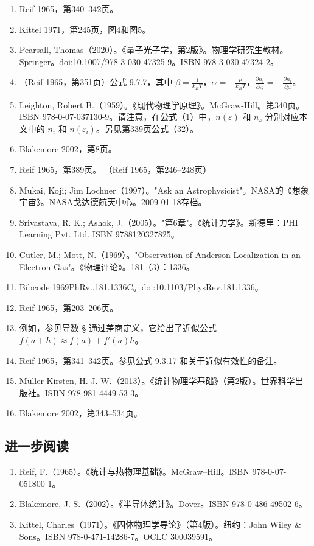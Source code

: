 \begin{enumerate}
\item Reif 1965，第340–342页。  
\item Kittel 1971，第245页，图4和图5。  
\item Pearsall, Thomas（2020）。《量子光子学，第2版》。物理学研究生教材。Springer。doi:10.1007/978-3-030-47325-9。ISBN 978-3-030-47324-2。  
\item （Reif 1965，第351页）公式 9.7.7，其中 \( \beta = \frac{1}{k_B T} \)，\( \alpha = -\frac{\mu}{k_B T} \)，\( \frac{\partial \bar{n}_i}{\partial \epsilon_i} = -\frac{\partial \bar{n}_i}{\partial \mu} \)。  
\item Leighton, Robert B.（1959）。《现代物理学原理》。McGraw-Hill。第340页。ISBN 978-0-07-037130-9。请注意，在公式（1）中，\( n(\varepsilon) \) 和 \( n_s \) 分别对应本文中的 \( \bar{n}_i \) 和 \( \bar{n}(\varepsilon_i) \)。另见第339页公式（32）。  
\item Blakemore 2002，第8页。  
\item Reif 1965，第389页。  
（Reif 1965，第246–248页）  
\item Mukai, Koji; Jim Lochner（1997）。"Ask an Astrophysicist"。NASA的《想象宇宙》。NASA戈达德航天中心。2009-01-18存档。  
\item Srivastava, R. K.; Ashok, J.（2005）。"第6章"。《统计力学》。新德里：PHI Learning Pvt. Ltd. ISBN 9788120327825。  
\item Cutler, M.; Mott, N.（1969）。"Observation of Anderson Localization in an Electron Gas"。《物理评论》。181（3）：1336。\item Bibcode:1969PhRv..181.1336C。doi:10.1103/PhysRev.181.1336。  
\item Reif 1965，第203–206页。  
\item 例如，参见导数 § 通过差商定义，它给出了近似公式  
\( f(a + h) \approx f(a) + f'(a)h \)。  
\item Reif 1965，第341–342页。参见公式 9.3.17 和关于近似有效性的备注。  
\item Müller-Kirsten, H. J. W.（2013）。《统计物理学基础》（第2版）。世界科学出版社。ISBN 978-981-4449-53-3。  
\item Blakemore 2002，第343–534页。
\end{enumerate}
\subsection{进一步阅读}
\begin{enumerate}  
\item Reif, F.（1965）。《统计与热物理基础》。McGraw–Hill。ISBN 978-0-07-051800-1。  
\item Blakemore, J. S.（2002）。《半导体统计》。Dover。ISBN 978-0-486-49502-6。  
\item Kittel, Charles（1971）。《固体物理学导论》（第4版）。纽约：John Wiley & Sons。ISBN 978-0-471-14286-7。OCLC 300039591。
\end{enumerate}